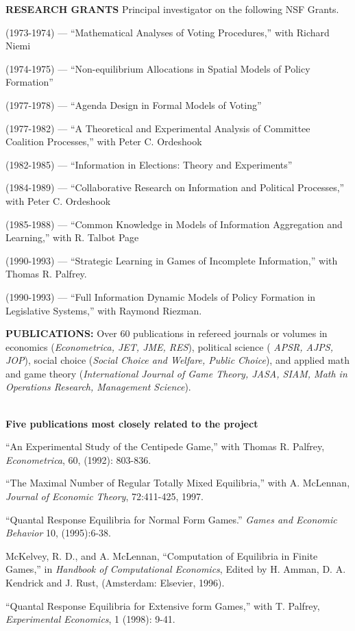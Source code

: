 \documentclass[12pt]{article}
\begin{document}
\noindent
{\bf RESEARCH GRANTS} Principal investigator on the following NSF Grants.
\begin{description}
\item
(1973-1974) --- ``Mathematical Analyses of Voting 
Procedures,'' with Richard Niemi
\item
(1974-1975) --- ``Non-equilibrium Allocations in 
Spatial Models of Policy Formation''
\item
(1977-1978) --- ``Agenda Design in Formal Models of 
Voting''
\item
(1977-1982) --- ``A Theoretical and Experimental 
Analysis of Committee Coalition Processes,'' with Peter C. Ordeshook
\item
(1982-1985) --- ``Information in Elections:  
Theory and Experiments''
\item
(1984-1989) --- ``Collaborative Research on
Information and Political Processes,'' with Peter C. Ordeshook
\item
(1985-1988) --- ``Common Knowledge in Models of
Information Aggregation and Learning,'' with R. Talbot Page
\item
(1990-1993) --- ``Strategic Learning in Games of
Incomplete Information,'' with Thomas R. Palfrey.
\item
(1990-1993) --- ``Full Information Dynamic Models of Policy Formation
in Legislative Systems,'' with Raymond Riezman.
\end{description}

\noindent
{\bf PUBLICATIONS:} Over 60 publications in refereed journals or volumes
in economics ({\it Econometrica, JET, JME, RES}), political science ({\it
APSR, AJPS, JOP}),  social choice ({\it Social Choice and Welfare, Public
Choice}), and applied math and game theory ({\it International Journal of
Game Theory, JASA, SIAM, Math in Operations Research, Management Science}).

\ \\
\noindent
{\bf Five publications most closely related to the project}
\begin{description}

\item
``An Experimental Study of the Centipede Game,'' with Thomas R. Palfrey,
{\it Econometrica}, 60, (1992): 803-836.
\item
``The Maximal Number of Regular Totally Mixed Equilibria,'' with
A. McLennan, {\it Journal of Economic Theory}, 72:411-425, 1997.
\item
``Quantal Response Equilibria for Normal Form Games.''  {\em Games and
Economic Behavior} 10, (1995):6-38.
\item
McKelvey, R. D., and A. McLennan, ``Computation of Equilibria in
Finite Games,'' in {\it Handbook of Computational
Economics}, Edited by H. Amman, D. A. Kendrick and J. Rust,
(Amsterdam: Elsevier, 1996).
\item
``Quantal Response Equilibria for Extensive form Games,'' with
T. Palfrey, {\it Experimental Economics}, 1 (1998): 9-41.
\end{description}
\end{document}
